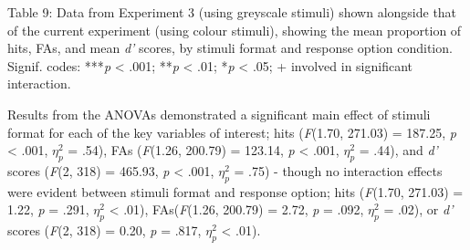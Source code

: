\documentclass[
  11pt,
]{article}
\begin{document}
\newpage

Table 9: Data from Experiment 3 (using greyscale stimuli) shown
alongside that of the current experiment (using colour stimuli), showing
the mean proportion of hits, FAs, and mean \emph{d'} scores, by stimuli
format and response option condition. Signif. codes: ***\emph{p}
\textless{} .001; **\emph{p} \textless{} .01; *\emph{p} \textless{} .05;
+ involved in significant interaction.

\begin{table}[!h]
\centering\begingroup\fontsize{13}{15}\selectfont

\endgroup{}
\end{table}

Results from the ANOVAs demonstrated a significant main effect of
stimuli format for each of the key variables of interest; hits
(\emph{F}(1.70, 271.03) = 187.25, \emph{p} \textless{} .001,
\(\eta^2_p\) = .54), FAs (\emph{F}(1.26, 200.79) = 123.14, \emph{p}
\textless{} .001, \(\eta^2_p\) = .44), and \emph{d'} scores (\emph{F}(2,
318) = 465.93, \emph{p} \textless{} .001, \(\eta^2_p\) = .75) - though
no interaction effects were evident between stimuli format and response
option; hits (\emph{F}(1.70, 271.03) = 1.22, \emph{p} = .291,
\(\eta^2_p\) \textless{} .01), FAs(\emph{F}(1.26, 200.79) = 2.72,
\emph{p} = .092, \(\eta^2_p\) = .02), or \emph{d'} scores (\emph{F}(2,
318) = 0.20, \emph{p} = .817, \(\eta^2_p\) \textless{} .01).
\end{document}
